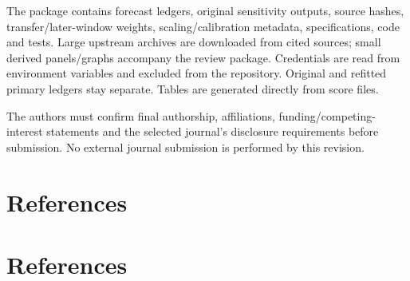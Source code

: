 \documentclass[
  10pt,
  a4paper,
]{article}
\begin{document}
The package contains forecast ledgers, original sensitivity outputs,
source hashes, transfer/later-window weights, scaling/calibration
metadata, specifications, code and tests. Large upstream archives are
downloaded from cited sources; small derived panels/graphs accompany the
review package. Credentials are read from environment variables and
excluded from the repository. Original and refitted primary ledgers stay
separate. Tables are generated directly from score files.

The authors must confirm final authorship, affiliations,
funding/competing-interest statements and the selected journal's
disclosure requirements before submission. No external journal
submission is performed by this revision.

\newpage

\section{References}\label{references}

\section*{References}\label{bibliography}
\end{document}
